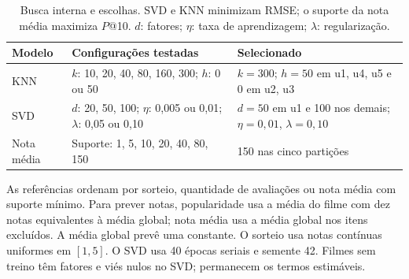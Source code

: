 \begin{table}[H]
\centering\small
\caption{Busca interna e escolhas. SVD e KNN minimizam RMSE; o suporte da
nota média maximiza $P$@10. $d$: fatores; $\eta$: taxa de aprendizagem;
$\lambda$: regularização.}
\begin{tabular}{@{}p{2.5cm}p{7.5cm}p{4.8cm}@{}}
\toprule
Modelo & Configurações testadas & Selecionado\\
\midrule
KNN & $k$: 10, 20, 40, 80, 160, 300; $h$: 0 ou 50 &
$k=300$; $h=50$ em u1, u4, u5 e 0 em u2, u3\\
\addlinespace
SVD & $d$: 20, 50, 100; $\eta$: 0,005 ou 0,01; $\lambda$: 0,05 ou 0,10 &
$d=50$ em u1 e 100 nos demais; $\eta=0{,}01$, $\lambda=0{,}10$\\
\addlinespace
Nota média & Suporte: 1, 5, 10, 20, 40, 80, 150 & 150 nas cinco partições\\
\bottomrule
\end{tabular}
\end{table}

As referências ordenam por sorteio, quantidade de avaliações ou nota média
com suporte mínimo. Para prever notas, popularidade usa a média do filme
com dez notas equivalentes à média global; nota média usa a média global
nos itens excluídos. A média global prevê uma constante. O sorteio usa notas
contínuas uniformes em $[1,5]$.
O SVD usa 40 épocas seriais e semente 42. Filmes sem treino têm fatores e
viés nulos no SVD; permanecem os termos estimáveis.

